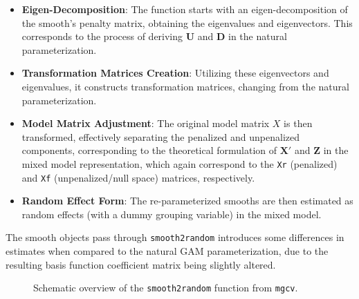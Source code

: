 \documentclass[12pt, twoside,hidelinks]{article}
\theoremstyle{definition}
\numberwithin{equation}{section}
\begin{document}
\begin{itemize}
  \item \textbf{Eigen-Decomposition}: The function starts with an eigen-decomposition of the smooth's penalty matrix, obtaining the eigenvalues and eigenvectors. This corresponds to the process of deriving \( \mathbf{U} \) and \( \mathbf{D} \) in the natural parameterization.
  
  \item \textbf{Transformation Matrices Creation}: Utilizing these eigenvectors and eigenvalues, it constructs transformation matrices, changing from the natural parameterization.

  \item \textbf{Model Matrix Adjustment}: The original model matrix \( X \) is then transformed, effectively separating the penalized and unpenalized components, corresponding to the theoretical formulation of \( \mathbf{X}' \) and \( \mathbf{Z} \) in the mixed model representation, which again correspond to the \texttt{Xr} (penalized) and \texttt{Xf} (unpenalized/null space) matrices, respectively.

  \item \textbf{Random Effect Form}: The re-parameterized smooths are then estimated as random effects (with a dummy grouping variable) in the mixed model.
\end{itemize}

The smooth objects pass through \texttt{smooth2random} introduces some differences in estimates when compared to the natural GAM parameterization, due to the resulting basis function coefficient matrix being slightly altered.


\begin{figure}[H]
\centering
{}
\caption{Schematic overview of the \texttt{smooth2random} function from \texttt{mgcv}.}
\end{figure}
\end{document}
